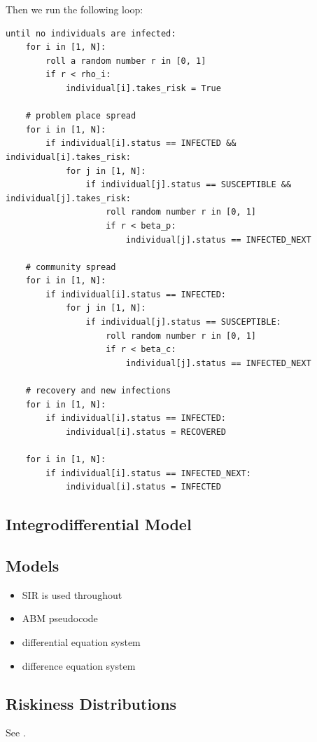 \documentclass{article}
\begin{document}
Then we run the following loop:
\begin{verbatim}
until no individuals are infected:
	for i in [1, N]:
		roll a random number r in [0, 1]
		if r < rho_i:
			individual[i].takes_risk = True

	# problem place spread
	for i in [1, N]:
		if individual[i].status == INFECTED && individual[i].takes_risk:
			for j in [1, N]:
				if individual[j].status == SUSCEPTIBLE && individual[j].takes_risk:
					roll random number r in [0, 1]
					if r < beta_p:
						individual[j].status == INFECTED_NEXT

	# community spread
	for i in [1, N]:
		if individual[i].status == INFECTED:
			for j in [1, N]:
				if individual[j].status == SUSCEPTIBLE:
					roll random number r in [0, 1]
					if r < beta_c:
						individual[j].status == INFECTED_NEXT

	# recovery and new infections
	for i in [1, N]:
		if individual[i].status == INFECTED:
			individual[i].status = RECOVERED

	for i in [1, N]:
		if individual[i].status == INFECTED_NEXT:
			individual[i].status = INFECTED
\end{verbatim}

\subsection{Integrodifferential Model}




\subsection{Models}

\begin{itemize}
\item SIR is used throughout
\item ABM pseudocode
\item differential equation system
\item difference equation system
\end{itemize}

\subsection{Riskiness Distributions}

See .
\end{document}
